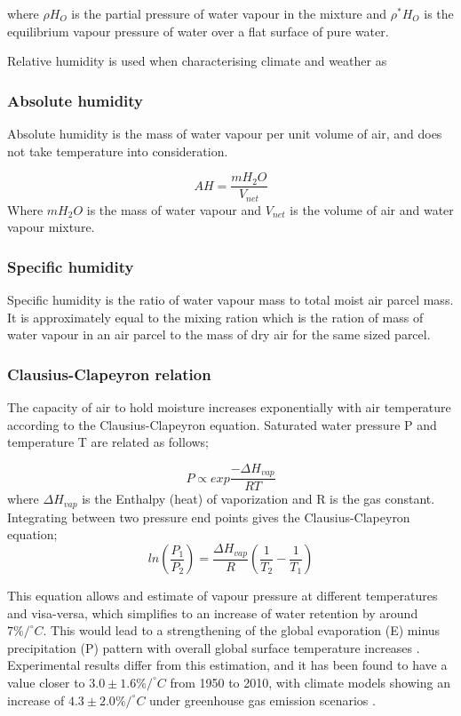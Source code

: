 \documentclass[11pt, oneside]{article}
\begin{document}
where $\rho H_O$ is the partial pressure of water vapour in the mixture and $\rho^* H_O$ is the equilibrium vapour pressure of water over a flat surface of pure water. 

Relative humidity is used when characterising climate and weather as 

\subsubsection{Absolute humidity}
Absolute humidity is the mass of water vapour per unit volume of air, and does not take temperature into consideration.

\begin{equation}
    AH = \frac{mH_2O}{V_{net}}
\end{equation}
Where $mH_2O$ is the mass of water vapour and $V_{net}$ is the volume of air and water vapour mixture. 



\subsubsection{Specific humidity}
Specific humidity is the ratio of water vapour mass to total moist air parcel mass. It is approximately equal to the mixing ration which is the ration of mass of water vapour in an air parcel to the mass of dry air for the same sized parcel. 




\subsubsection{Clausius-Clapeyron relation}\label{cc}
The capacity of air to hold moisture increases exponentially with air temperature according to the Clausius-Clapeyron equation. Saturated water pressure P and temperature T are related as follows;

\begin{equation}
    P \propto exp\frac{-\Delta H_{vap}}{RT}
\end{equation}
where $\Delta H_{vap}$  is the Enthalpy (heat) of vaporization and R is the gas constant. Integrating between two pressure end points gives the Clausius-Clapeyron equation;  
\begin{equation}
    ln \left ( \frac{P_1}{P_2} \right ) = \frac{\Delta H_{vap}}{R} \left ( \frac{1}{T_2} - \frac{1}{T_1} \right )
\end{equation}

This equation allows and estimate of vapour pressure at different temperatures and visa-versa, which simplifies to an increase of water retention by around $7\% / ^{\circ} C $. This would lead to a strengthening of the global evaporation (E) minus precipitation (P) pattern with overall global surface temperature increases \cite{held2006robust}. Experimental results differ from this estimation, and it has been found to have a value closer to $3.0 \pm 1.6 \% / ^{\circ} C $ from 1950 to 2010, with climate models showing an increase of $4.3 \pm 2.0 \% / ^{\circ} C $ under greenhouse gas emission scenarios \cite{Skliris2016}. 
\end{document}
